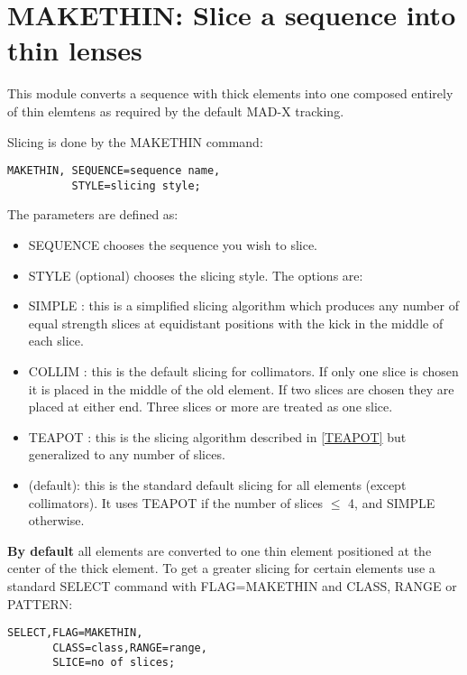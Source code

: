  
\chapter{MAKETHIN: Slice a sequence into thin lenses}
\label{chap:makethin}

This module converts a sequence with thick elements into one composed
entirely of thin elemtens as required by the default MAD-X tracking.  
 
Slicing is done by the MAKETHIN command: 
\begin{verbatim}
MAKETHIN, SEQUENCE=sequence name,
          STYLE=slicing style;
\end{verbatim} 

The parameters are defined as: 
\begin{itemize}
   \item SEQUENCE chooses the sequence you wish to slice. 
   \item STYLE (optional) chooses the slicing style. The options are:   
   \item SIMPLE : this is a simplified slicing algorithm which produces
     any number of equal strength slices at equidistant positions with
     the kick in the middle of each slice.      
   \item COLLIM : this is the default slicing for collimators. If only
     one slice is  chosen it is placed in the middle of the old
     element. If two slices are chosen they  are placed at either
     end. Three slices or more are treated as one slice.      
   \item TEAPOT : this is the slicing algorithm described in
     \href{../Introduction/bibliography.html#TEAPOT}{[TEAPOT]} but
     generalized to any number of slices.      
   \item      (default): this is the standard default slicing for all
     elements (except collimators). It uses TEAPOT if the number of
     slices $\leq$ 4, and SIMPLE otherwise.     
\end{itemize}
\textbf{By default} all elements are converted to one thin element
positioned at the center of  the thick element. To get a greater slicing
for certain elements use a standard SELECT command with FLAG=MAKETHIN
and  CLASS, RANGE or PATTERN:  

\begin{verbatim}
SELECT,FLAG=MAKETHIN,
       CLASS=class,RANGE=range,
       SLICE=no of slices;
\end{verbatim}

